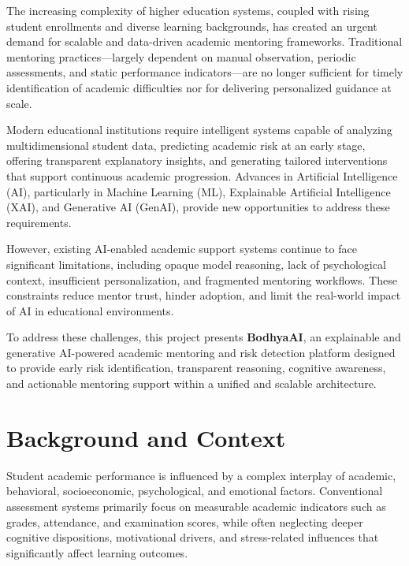 \documentclass[12pt,a4paper]{report}
\begin{document}
\setlength{\headheight}{16pt}
\setlength{\headsep}{20pt}


The increasing complexity of higher education systems, coupled with rising student enrollments and diverse learning backgrounds, has created an urgent demand for scalable and data-driven academic mentoring frameworks. Traditional mentoring practices—largely dependent on manual observation, periodic assessments, and static performance indicators—are no longer sufficient for timely identification of academic difficulties nor for delivering personalized guidance at scale.

Modern educational institutions require intelligent systems capable of analyzing multidimensional student data, predicting academic risk at an early stage, offering transparent explanatory insights, and generating tailored interventions that support continuous academic progression. Advances in Artificial Intelligence (AI), particularly in Machine Learning (ML), Explainable Artificial Intelligence (XAI), and Generative AI (GenAI), provide new opportunities to address these requirements.

However, existing AI-enabled academic support systems continue to face significant limitations, including opaque model reasoning, lack of psychological context, insufficient personalization, and fragmented mentoring workflows. These constraints reduce mentor trust, hinder adoption, and limit the real-world impact of AI in educational environments.

To address these challenges, this project presents \textbf{BodhyaAI}, an explainable and generative AI-powered academic mentoring and risk detection platform designed to provide early risk identification, transparent reasoning, cognitive awareness, and actionable mentoring support within a unified and scalable architecture.

\section{Background and Context}

Student academic performance is influenced by a complex interplay of academic, behavioral, socioeconomic, psychological, and emotional factors. Conventional assessment systems primarily focus on measurable academic indicators such as grades, attendance, and examination scores, while often neglecting deeper cognitive dispositions, motivational drivers, and stress-related influences that significantly affect learning outcomes.
\end{document}
